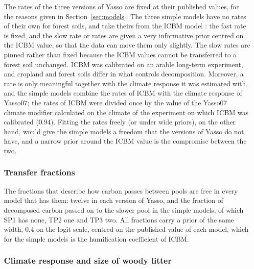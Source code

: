 \documentclass[11pt]{article}
\begin{document}
The rates of the three versions of Yasso are fixed at their published values, for the reasons
given in Section~\ref{sec:models}. The three simple models have no rates of their own for
forest soils, and take theirs from the ICBM model \citep{AndrenKatterer1997}: the fast rate is
fixed, and the slow rate or rates are given a very informative prior centred on the ICBM value,
so that the data can move them only slightly. The slow rates are pinned rather than fixed
because the ICBM values cannot be transferred to a forest soil unchanged. ICBM was calibrated
on an arable long-term experiment, and cropland and forest soils differ in what controls
decomposition. Moreover, a rate is only meaningful together
with the climate response it was estimated with, and the simple models combine the rates of
ICBM with the climate response of Yasso07; the rates of ICBM were divided once by the value of the Yasso07 climate modifier calculated on the climate of the experiment on which ICBM was calibrated ($0.94$).
Fitting the rates freely (or under wide priors), on the other hand, would give the simple
models a freedom that the versions of Yasso do not have, and a narrow prior around the ICBM
value is the compromise between the two.

\subsubsection{Transfer fractions}

The fractions that describe how carbon passes between pools are free in every model that has
them: twelve in each version of Yasso, and the fraction of decomposed carbon passed on to the
slower pool in the simple models, of which SP1 has none, TP2 one and TP3 two. All fractions
carry a prior of the same width, $0.4$ on the logit scale, centred on the published value of
each model, which for the simple models is the humification coefficient of ICBM.

\subsubsection{Climate response and size of woody litter}
\end{document}
